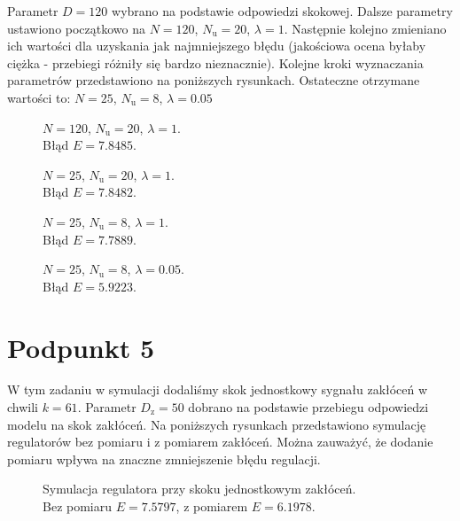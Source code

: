 Parametr $ D = \num{120} $ wybrano na podstawie odpowiedzi skokowej. Dalsze parametry ustawiono początkowo na $ N = \num{120} $, $ N_\mathrm{u} = \num{20} $, $ \lambda = \num{1} $. Następnie kolejno zmieniano ich wartości dla uzyskania jak najmniejszego błędu (jakościowa ocena byłaby ciężka - przebiegi różniły się bardzo nieznacznie). Kolejne kroki wyznaczania parametrów przedstawiono na poniższych rysunkach. Ostateczne otrzymane wartości to: $ N = \num{25} $, $ N_\mathrm{u} = \num{8} $, $ \lambda = \num{0,05} $

\begin{figure}[ht]
\centering

\caption{$ N = \num{120} $, $ N_\mathrm{u} = \num{20} $, $ \lambda = \num{1} $.\\Błąd $ E = \num{7,8485} $.}
\label{Z4a}
\end{figure}
\begin{figure}[ht]
\centering

\caption{$ N = \num{25} $, $ N_\mathrm{u} = \num{20} $, $ \lambda = \num{1} $.\\Błąd $ E = \num{7,8482} $.}
\label{Z4b}
\end{figure}
\begin{figure}[ht]
\centering

\caption{$ N = \num{25} $, $ N_\mathrm{u} = \num{8} $, $ \lambda = \num{1} $.\\Błąd $ E = \num{7,7889} $.}
\label{Z4c}
\end{figure}
\begin{figure}[ht]
\centering

\caption{$ N = \num{25} $, $ N_\mathrm{u} = \num{8} $, $ \lambda = \num{0,05} $.\\Błąd $ E = \num{5,9223} $.}
\label{Z4d}
\end{figure}

\chapter{Podpunkt 5}
W tym zadaniu w symulacji dodaliśmy skok jednostkowy sygnału zakłóceń w chwili $ k = 61 $. Parametr $ D_\mathrm{z} = 50 $ dobrano na podstawie przebiegu odpowiedzi modelu na skok zakłóceń. Na poniższych rysunkach przedstawiono symulację regulatorów bez pomiaru i z pomiarem zakłóceń. Można zauważyć, że dodanie pomiaru wpływa na znaczne zmniejszenie błędu regulacji.


\begin{figure}[ht]
\centering

\caption{Symulacja regulatora przy skoku jednostkowym zakłóceń.\\Bez pomiaru $ E = \num{7,5797} $, z pomiarem $ E = \num{6,1978} $.}
\label{Z5a}
\end{figure}


